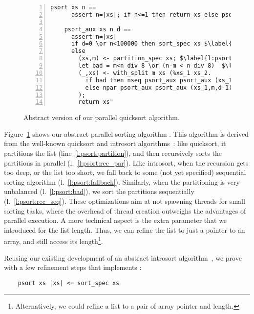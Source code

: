 \documentclass[sn-mathphys,Numbered]{sn-jnl}
\theoremstyle{thmstyleone}%
\theoremstyle{definition}%
\theoremstyle{thmstylethree}%
\begin{document}
  \begin{figure}
  \begin{lstlisting}[numbers=left,xleftmargin=1.9em,frame=single,framexleftmargin=.5em]
    psort xs n ==
      assert n=|xs|; if n<=1 then return xs else psort_aux$\hspace*{-1pt}$ xs$\hspace*{-1pt}$ n$\hspace*{-1pt}$ (log2$\hspace*{-1pt}$ n$\hspace*{-1pt}$ *$\hspace*{-1pt}$ 2)

    psort_aux xs n d ==
      assert n=|xs|
      if d=0 \or n<100000 then sort_spec xs $\label{l:psort:fallback}$
      else
        (xs,m) <- partition_spec xs; $\label{l:psort:partition}$
        let bad = m<n div 8 \or (n-m < n div 8)  $\label{l:psort:bad}$
        (_,xs) <- with_split m xs (%xs_1 xs_2.
          if bad then nseq psort_aux psort_aux (xs_1,m,d-1) (xs_2,n-m,d-1) $\label{l:psort:rec_seq}$
          else npar psort_aux psort_aux (xs_1,m,d-1) (xs_2,n-m,d-1)  $\label{l:psort:rec_par}$
        );
        return xs"
  \end{lstlisting}
  \caption{Abstract version of our parallel quicksort algorithm.}\label{fig:psort}
  \end{figure}

  Figure~\ref{fig:psort} shows our abstract parallel sorting algorithm .
  This algorithm is derived from the well-known quicksort and introsort algorithms~\cite{Muss97}:
  like quicksort, it partitions the list (line~\ref{l:psort:partition}), and then recursively sorts the partitions in parallel (l.~\ref{l:psort:rec_par}).
  Like introsort, when the recursion gets too deep, or the list too short, we fall back to
  some (not yet specified) sequential sorting algorithm (l.~\ref{l:psort:fallback}). Similarly, when the partitioning is very unbalanced (l.~\ref{l:psort:bad}),
  we sort the partitions sequentially (l.~\ref{l:psort:rec_seq}). These optimizations aim at not spawning threads for small sorting tasks, where
  the overhead of thread creation outweighs the advantages of parallel execution.
  A more technical aspect is the extra parameter  that we introduced for the list length.
  Thus, we can refine the list to just a pointer to an array, and still access its length\footnote{Alternatively, we could refine a list to a pair of array pointer and length.}.

  Reusing our existing development of an abstract introsort algorithm~\cite{La20},
  we prove with a few refinement steps that  implements :
  \begin{lstlisting}
    psort xs |xs| <= sort_spec xs
  \end{lstlisting}
\end{document}

